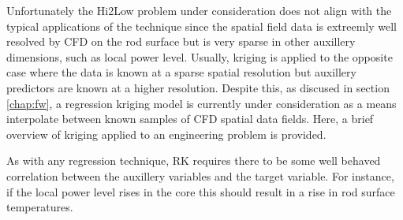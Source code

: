 Unfortunately the Hi2Low problem under consideration does not align with the typical applications of the technique since the spatial field data is extreemly well resolved by CFD on the rod surface but is very sparse in other auxillery dimensions, such as local power level.  Usually, kriging is applied to the opposite case where the data is known at a sparse spatial resolution but auxillery predictors are known at a higher resolution.  Despite this, as discused in section \ref{chap:fw}, a regression kriging model is currently under consideration as a means interpolate between known samples of CFD spatial data fields.  Here, a brief overview of kriging applied to an engineering problem is provided.

As with any regression technique, RK requires there to be some well behaved correlation between the auxillery variables and the target variable.  For instance, if the local power level rises in the core this should result in a rise in rod surface temperatures.


